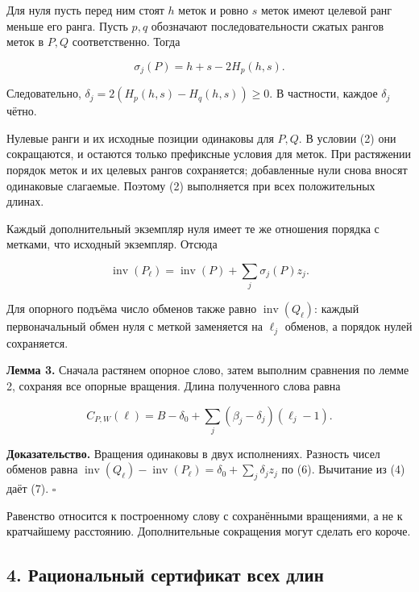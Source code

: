 \documentclass[
  11pt,
  a4paper,
]{article}
\begin{document}
Для нуля пусть перед ним стоят \(h\) меток и ровно \(s\) меток имеют
целевой ранг меньше его ранга. Пусть \(p,q\) обозначают
последовательности сжатых рангов меток в \(P,Q\) соответственно. Тогда

\[\sigma_j(P)=h+s-2H_p(h,s).\]

Следовательно, \(\delta_j=2(H_p(h,s)-H_q(h,s))\ge0\). В частности,
каждое \(\delta_j\) чётно.

Нулевые ранги и их исходные позиции одинаковы для \(P,Q\). В условии (2)
они сокращаются, и остаются только префиксные условия для меток. При
растяжении порядок меток и их целевых рангов сохраняется; добавленные
нули снова вносят одинаковые слагаемые. Поэтому (2) выполняется при всех
положительных длинах.

Каждый дополнительный экземпляр нуля имеет те же отношения порядка с
метками, что исходный экземпляр. Отсюда

\[\operatorname{inv}(P_\ell)=\operatorname{inv}(P)
+\sum_j\sigma_j(P)z_j.\tag{6}\]

Для опорного подъёма число обменов также равно
\(\operatorname{inv}(Q_\ell)\): каждый первоначальный обмен нуля с
меткой заменяется на \(\ell_j\) обменов, а порядок нулей сохраняется.

\textbf{Лемма 3.} Сначала растянем опорное слово, затем выполним
сравнения по лемме 2, сохраняя все опорные вращения. Длина полученного
слова равна

\[\boxed{C_{P,W}(\ell)=B-\delta_0+
\sum_j(\beta_j-\delta_j)(\ell_j-1).}\tag{7}\]

\textbf{Доказательство.} Вращения одинаковы в двух исполнениях. Разность
чисел обменов равна
\(\operatorname{inv}(Q_\ell)-\operatorname{inv}(P_\ell) =\delta_0+\sum_j\delta_jz_j\)
по (6). Вычитание из (4) даёт (7). \(\square\)

Равенство относится к построенному слову с сохранёнными вращениями, а не
к кратчайшему расстоянию. Дополнительные сокращения могут сделать его
короче.

\hypertarget{ux440ux430ux446ux438ux43eux43dux430ux43bux44cux43dux44bux439-ux441ux435ux440ux442ux438ux444ux438ux43aux430ux442-ux432ux441ux435ux445-ux434ux43bux438ux43d}{%
\subsection{4. Рациональный сертификат всех
длин}\label{ux440ux430ux446ux438ux43eux43dux430ux43bux44cux43dux44bux439-ux441ux435ux440ux442ux438ux444ux438ux43aux430ux442-ux432ux441ux435ux445-ux434ux43bux438ux43d}}
\end{document}
